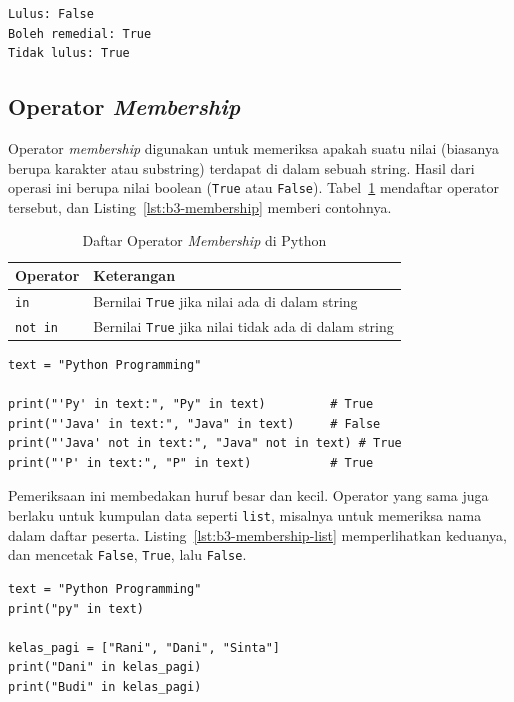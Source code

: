 \begin{lstlisting}[language=bash, caption={Keluaran syarat_lulus.py}, label={lst:b3-syarat-out}]
Lulus: False
Boleh remedial: True
Tidak lulus: True
\end{lstlisting}


\subsection{Operator \textit{Membership}}
Operator \textit{membership} digunakan untuk memeriksa apakah suatu nilai (biasanya berupa karakter atau substring) 
terdapat di dalam sebuah string. Hasil dari operasi ini berupa nilai boolean (\texttt{True} atau \texttt{False}). Tabel~\ref{tab:b3-membership} mendaftar operator tersebut, dan Listing~\ref{lst:b3-membership} memberi contohnya.

\begin{table}[H]
  \centering
  \caption{Daftar Operator \textit{Membership} di Python}
  \label{tab:b3-membership}
  \begin{tabularx}{\textwidth}{lX}
    \hline
    \textbf{Operator} & \textbf{Keterangan} \\
    \hline
    \texttt{in} & Bernilai \texttt{True} jika nilai ada di dalam string \\
    \hline
    \texttt{not in} & Bernilai \texttt{True} jika nilai tidak ada di dalam string \\
    \hline
  \end{tabularx}
\end{table}

\begin{lstlisting}[style=PythonStyle, caption={Kode Python: membership_operator.py}, label={lst:b3-membership}]
text = "Python Programming"

print("'Py' in text:", "Py" in text)         # True
print("'Java' in text:", "Java" in text)     # False
print("'Java' not in text:", "Java" not in text) # True
print("'P' in text:", "P" in text)           # True
\end{lstlisting}

Pemeriksaan ini membedakan huruf besar dan kecil. Operator yang sama juga berlaku untuk kumpulan data seperti \texttt{list}, misalnya untuk memeriksa nama dalam daftar peserta. Listing~\ref{lst:b3-membership-list} memperlihatkan keduanya, dan mencetak \texttt{False}, \texttt{True}, lalu \texttt{False}.

\begin{lstlisting}[style=PythonStyle, caption={Kode Python: membership_list.py}, label={lst:b3-membership-list}]
text = "Python Programming"
print("py" in text)

kelas_pagi = ["Rani", "Dani", "Sinta"]
print("Dani" in kelas_pagi)
print("Budi" in kelas_pagi)
\end{lstlisting}

